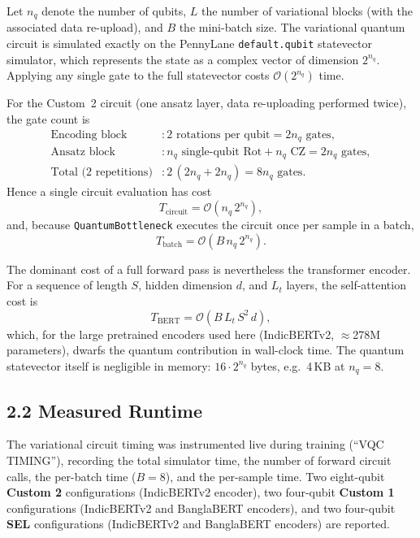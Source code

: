 \documentclass[11pt]{article}
\begin{document}
Let $n_q$ denote the number of qubits, $L$ the number of variational blocks (with the associated
data re-upload), and $B$ the mini-batch size. The variational quantum circuit is simulated
exactly on the PennyLane \texttt{default.qubit} statevector simulator, which represents the
state as a complex vector of dimension $2^{n_q}$. Applying any single gate to the full
statevector costs $\mathcal{O}(2^{n_q})$ time.

For the Custom~2 circuit (one ansatz layer, data re-uploading performed twice), the gate count is
\begin{align*}
\text{Encoding block} &: \text{2 rotations per qubit} = 2n_q \text{ gates}, \\
\text{Ansatz block}   &: n_q \text{ single-qubit Rot} + n_q \text{ CZ} = 2n_q \text{ gates}, \\
\text{Total (2 repetitions)} &: 2\,(2n_q + 2n_q) = 8 n_q \text{ gates}.
\end{align*}
Hence a single circuit evaluation has cost
\[
T_{\text{circuit}} = \mathcal{O}\!\left(n_q \, 2^{n_q}\right),
\]
and, because \texttt{QuantumBottleneck} executes the circuit once per sample in a batch,
\[
T_{\text{batch}} = \mathcal{O}\!\left(B \, n_q \, 2^{n_q}\right).
\]

The dominant cost of a full forward pass is nevertheless the transformer encoder. For a
sequence of length $S$, hidden dimension $d$, and $L_t$ layers, the self-attention cost is
\[
T_{\text{BERT}} = \mathcal{O}\!\left(B\, L_t\, S^2\, d\right),
\]
which, for the large pretrained encoders used here (IndicBERTv2, $\approx$278M parameters),
dwarfs the quantum contribution in wall-clock time. The quantum statevector itself is
negligible in memory: $16 \cdot 2^{n_q}$ bytes, e.g.\ 4\,KB at $n_q = 8$.

\subsection*{2.2 Measured Runtime}

The variational circuit timing was instrumented live during training (``VQC TIMING''),
recording the total simulator time, the number of forward circuit calls, the per-batch time
($B = 8$), and the per-sample time. Two eight-qubit \textbf{Custom 2} configurations
(IndicBERTv2 encoder), two four-qubit \textbf{Custom 1} configurations (IndicBERTv2 and
BanglaBERT encoders), and two four-qubit \textbf{SEL} configurations (IndicBERTv2 and
BanglaBERT encoders) are reported.
\end{document}
